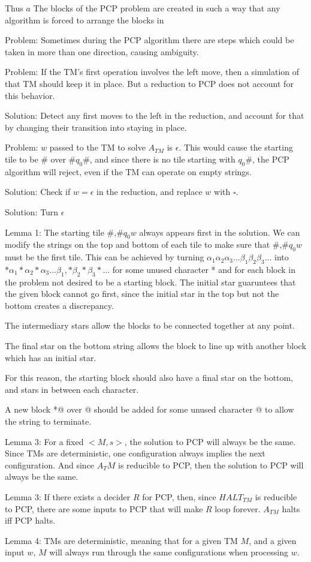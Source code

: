 \documentclass[letterpaper,notitlepage,twoside]{article}
\begin{document}
Thus 
$a$
The blocks of the PCP problem are created in such a way that any algorithm is forced to arrange the blocks in

Problem: Sometimes during the PCP algorithm there are steps which could be taken in more than one direction, causing ambiguity.

Problem: If the TM's first operation involves the left move, then a simulation of that TM should keep it in place. But a reduction to PCP does not account for this behavior.

Solution: Detect any first moves to the left in the reduction, and account for that by changing their transition into staying in place.

Problem: $w$ passed to the TM to solve $A_{TM}$ is $\epsilon$. This would cause the starting tile to be \# over \#$q_0$\#, and since there is no tile starting with $q_0$\#, the PCP algorithm will reject, even if the TM can operate on empty strings.

Solution: Check if $w = \epsilon$ in the reduction, and replace $w$ with $\square$.

Solution: Turn $\epsilon$

Lemma 1: The starting tile \#,\#$q_0$$w$ always appears first in the solution.
We can modify the strings on the top and bottom of each tile to make sure that $\#$,$\#$$q_0$$w$ must be the first tile. This can be achieved by turning $\alpha_1\alpha_2\alpha_3...\beta_1\beta_2\beta_3...$ into $*\alpha_1*\alpha_2*\alpha_3...\beta_1,*\beta_2*\beta_3*...$ for some unused character * and for each block in the problem not desired to be a starting block. The initial star guaruntees that the given block cannot go first, since the initial star in the top but not the bottom creates a discrepancy.

The intermediary stars allow the blocks to be connected together at any point. 

The final star on the bottom string allows the block to line up with another block which has an initial star.

For this reason, the starting block should also have a final star on the bottom, and stars in between each character.

A new block *@ over @ should be added for some unused character @ to allow the string to terminate.

Lemma 3: For a fixed $<M, s>$, the solution to PCP will always be the same.
Since TMs are deterministic, one configuration always implies the next configuration. And since $A_TM$ is reducible to PCP, then the solution to PCP will always be the same.


Lemma 3: If there exists a decider $R$ for PCP, then, since $HALT_{TM}$ is reducible to PCP, there are some inputs to PCP that will make $R$ loop forever. $A_{TM}$ halts iff PCP halts.

Lemma 4: TMs are deterministic, meaning that for a given TM $M$, and a given input $w$, $M$ will always run through the same configurations when processing $w$.
\end{document}
